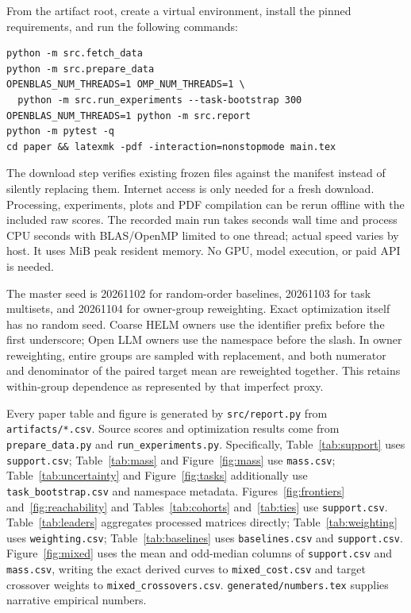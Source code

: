 \documentclass{article}
\begin{document}
From the artifact root, create a virtual environment, install the pinned
requirements, and run the following commands:
\begin{verbatim}
python -m src.fetch_data
python -m src.prepare_data
OPENBLAS_NUM_THREADS=1 OMP_NUM_THREADS=1 \
  python -m src.run_experiments --task-bootstrap 300
OPENBLAS_NUM_THREADS=1 python -m src.report
python -m pytest -q
cd paper && latexmk -pdf -interaction=nonstopmode main.tex
\end{verbatim}
The download step verifies existing frozen files against the manifest instead of
silently replacing them. Internet access is only needed for a fresh download.
Processing, experiments, plots and PDF compilation can be rerun offline with the
included raw scores. The recorded main run takes \RunWallSeconds{} seconds wall
time and \RunCpuSeconds{} process CPU seconds with BLAS/OpenMP limited to one
thread; actual speed varies by host. It uses \RunPeakMiB{} MiB peak resident
memory. No GPU, model execution, or paid API is needed.

The master seed is 20261102 for random-order baselines, 20261103 for task
multisets, and 20261104 for owner-group reweighting. Exact optimization itself has
no random seed. Coarse HELM owners use the identifier prefix before the first
underscore; Open LLM owners use the namespace before the slash. In owner
reweighting, entire groups are sampled with replacement, and both numerator and
denominator of the paired target mean are reweighted together. This retains
within-group dependence as represented by that imperfect proxy.

Every paper table and figure is generated by \texttt{src/report.py} from
\texttt{artifacts/*.csv}. Source scores and optimization results come from
\texttt{prepare\_data.py} and \texttt{run\_experiments.py}. Specifically,
Table~\ref{tab:support} uses \texttt{support.csv}; Table~\ref{tab:mass} and
Figure~\ref{fig:mass} use \texttt{mass.csv}; Table~\ref{tab:uncertainty} and
Figure~\ref{fig:tasks} additionally use \texttt{task\_bootstrap.csv} and namespace
metadata. Figures~\ref{fig:frontiers} and~\ref{fig:reachability} and
Tables~\ref{tab:cohorts} and~\ref{tab:ties} use \texttt{support.csv}.
Table~\ref{tab:leaders} aggregates processed matrices directly;
Table~\ref{tab:weighting} uses \texttt{weighting.csv};
Table~\ref{tab:baselines} uses \texttt{baselines.csv} and \texttt{support.csv}.
Figure~\ref{fig:mixed} uses the mean and odd-median columns of
\texttt{support.csv} and \texttt{mass.csv}, writing the exact derived curves to
\texttt{mixed\_cost.csv} and target crossover weights to
\texttt{mixed\_crossovers.csv}.
\texttt{generated/numbers.tex} supplies narrative empirical numbers.
\end{document}
